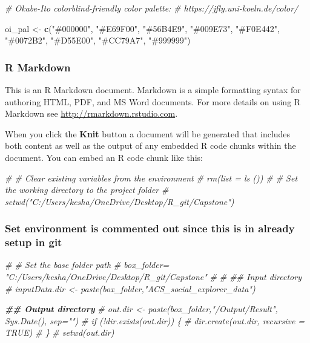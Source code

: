 \documentclass[
]{article}
\newenvironment{Shaded}{\begin{snugshade}}{\end{snugshade}}
\newcommand{\CommentTok}[1]{\textcolor[rgb]{0.56,0.35,0.01}{\textit{#1}}}
\newcommand{\DocumentationTok}[1]{\textcolor[rgb]{0.56,0.35,0.01}{\textbf{\textit{#1}}}}
\newcommand{\FunctionTok}[1]{\textcolor[rgb]{0.13,0.29,0.53}{\textbf{#1}}}
\newcommand{\NormalTok}[1]{#1}
\newcommand{\OtherTok}[1]{\textcolor[rgb]{0.56,0.35,0.01}{#1}}
\newcommand{\StringTok}[1]{\textcolor[rgb]{0.31,0.60,0.02}{#1}}
\begin{document}
\begin{Shaded}
\begin{Highlighting}[]
\CommentTok{\# Okabe{-}Ito colorblind{-}friendly color palette:}
\CommentTok{\# https://jfly.uni{-}koeln.de/color/}

\NormalTok{oi\_pal }\OtherTok{\textless{}{-}} \FunctionTok{c}\NormalTok{(}\StringTok{"\#000000"}\NormalTok{, }\StringTok{"\#E69F00"}\NormalTok{, }\StringTok{"\#56B4E9"}\NormalTok{, }\StringTok{"\#009E73"}\NormalTok{, }\StringTok{"\#F0E442"}\NormalTok{, }
     \StringTok{"\#0072B2"}\NormalTok{, }\StringTok{"\#D55E00"}\NormalTok{, }\StringTok{"\#CC79A7"}\NormalTok{, }\StringTok{"\#999999"}\NormalTok{)}
\end{Highlighting}
\end{Shaded}

\hypertarget{r-markdown}{%
\subsubsection{R Markdown}\label{r-markdown}}

This is an R Markdown document. Markdown is a simple formatting syntax
for authoring HTML, PDF, and MS Word documents. For more details on
using R Markdown see \url{http://rmarkdown.rstudio.com}.

When you click the \textbf{Knit} button a document will be generated
that includes both content as well as the output of any embedded R code
chunks within the document. You can embed an R code chunk like this:

\begin{Shaded}
\begin{Highlighting}[]
\CommentTok{\# \# Clear existing variables from the environment}
\CommentTok{\# rm(list = ls ())}
\CommentTok{\# \# Set the working directory to the project folder}
\CommentTok{\# setwd("C:/Users/kesha/OneDrive/Desktop/R\_git/Capstone")}
\end{Highlighting}
\end{Shaded}

\hypertarget{set-environment-is-commented-out-since-this-is-in-already-setup-in-git}{%
\subsubsection{Set environment is commented out since this is in already
setup in
git}\label{set-environment-is-commented-out-since-this-is-in-already-setup-in-git}}

\begin{Shaded}
\begin{Highlighting}[]
\CommentTok{\# \# Set the base folder path}
\CommentTok{\# box\_folder=  "C:/Users/kesha/OneDrive/Desktop/R\_git/Capstone" }
\CommentTok{\# }
\CommentTok{\# \#\# Input directory}
\CommentTok{\# inputData.dir \textless{}{-} paste(box\_folder,"ACS\_social\_explorer\_data")}

\DocumentationTok{\#\# Output directory}
\CommentTok{\# out.dir \textless{}{-} paste(box\_folder,"/Output/Result", Sys.Date(), sep="")}
\CommentTok{\# if (!dir.exists(out.dir)) \{}
\CommentTok{\#   dir.create(out.dir, recursive = TRUE)}
\CommentTok{\# \}}
\CommentTok{\# setwd(out.dir)}
\end{Highlighting}
\end{Shaded}
\end{document}
